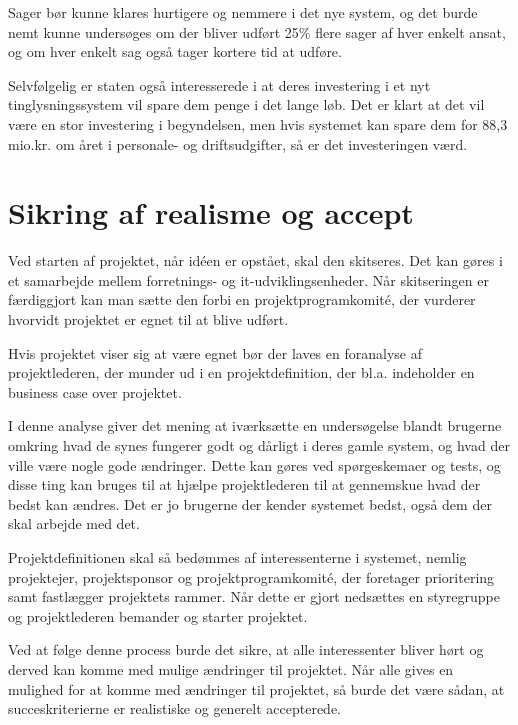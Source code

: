 \documentclass[10pt,a4paper,danish]{article}
\begin{document}
Sager bør kunne klares hurtigere og nemmere i det nye system, og det burde nemt kunne undersøges om der bliver udført 25\% flere sager af hver enkelt ansat, og om hver enkelt sag også tager kortere tid at udføre.

Selvfølgelig er staten også interesserede i at deres investering i et nyt tinglysningssystem vil spare dem penge i det lange løb. Det er klart at det vil være en stor investering i begyndelsen, men hvis systemet kan spare dem for 88,3 mio.kr. om året i personale- og driftsudgifter, så er det investeringen værd.


\section{Sikring af realisme og accept}
Ved starten af projektet, når idéen er opstået, skal den skitseres. Det kan gøres i et samarbejde mellem forretnings- og it-udviklingsenheder. Når skitseringen er færdiggjort kan man sætte den forbi en projektprogramkomité, der vurderer hvorvidt projektet er egnet til at blive udført. 

Hvis projektet viser sig at være egnet bør der laves en foranalyse af projektlederen, der munder ud i en projektdefinition, der bl.a. indeholder en business case over projektet. 

I denne analyse giver det mening at iværksætte en undersøgelse blandt brugerne omkring hvad de synes fungerer godt og dårligt i deres gamle system, og hvad der ville være nogle gode ændringer. Dette kan gøres ved spørgeskemaer og tests, og disse ting kan bruges til at hjælpe projektlederen til at gennemskue hvad der bedst kan ændres. Det er jo brugerne der kender systemet bedst, også dem der skal arbejde med det.

Projektdefinitionen skal så bedømmes af interessenterne i 
systemet, nemlig projektejer, projektsponsor og projektprogramkomité, der foretager prioritering samt fastlægger projektets rammer. Når dette er gjort nedsættes en styregruppe og projektlederen bemander og starter projektet. 

Ved at følge denne process burde det sikre, at alle interessenter bliver hørt og derved kan komme med mulige ændringer til projektet. Når alle gives en mulighed for at komme med ændringer til projektet, så burde det være sådan, at succeskriterierne er realistiske og generelt accepterede.
\end{document}
